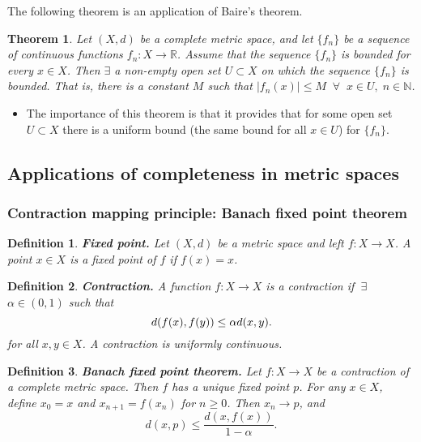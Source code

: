 \documentclass[two column]{article}
\newtheorem{theorem}{Theorem}[subsection]
\newtheorem{definition}{Definition}[subsection]
\begin{document}
The following theorem is an application of Baire's theorem.\\

\begin{theorem}
Let $(X,d)$ be a complete metric space, and let $\{f_{n}\}$ be a sequence of continuous functions $f_{n}: X \rightarrow \mathbb{R}$. Assume that the sequence $\{f_{n}\}$ is bounded for every $x \in X$. Then $\exists$ a non-empty open set $U \subset X$ on which the sequence $\{f_{n}\}$ is bounded. That is, there is a constant $M$ such that $\lvert f_{n}(x) \rvert \leq M \;\; \forall \;\; x\in U, \; n \in \mathbb{N}$.
\end{theorem}
\begin{itemize}
\item The importance of this theorem is that it provides that for some open set $U \subset X$ there is a uniform bound (the same bound for all $x \in U$) for $\{f_{n}\}$.
\end{itemize}

\subsection{Applications of completeness in metric spaces}

\subsubsection{Contraction mapping principle: Banach fixed point theorem}

\begin{definition}
{\bf Fixed point.} Let $(X,d)$ be a metric space and left $f:X \rightarrow X$. A point $x \in X$ is a fixed point of $f$ if $f(x) = x$.\\ 
\end{definition}

\begin{definition}
{\bf Contraction.} A function $f:X \rightarrow X$ is a contraction if $\: \exists$ $\alpha \in (0,1)$ such that \vspace{-6pt}
\[ d(f(x),f(y)) \leq \alpha d(x,y).  \vspace{-6pt} \]
for all $x,y \in X$. A contraction is uniformly continuous.\\
\end{definition}

\begin{definition}
{\bf Banach fixed point theorem.} Let $f:X \rightarrow X$ be a contraction of a complete metric space. Then $f$ has a unique fixed point $p$. For any $x \in X$, define $x_{0} = x$ and $x_{n+1} = f(x_{n})$ for $n \geq 0$. Then $x_{n} \rightarrow p$, and \vspace{-4pt}
\[
d(x,p) \leq \frac{d(x,f(x))}{1 - \alpha}.
\]
\end{definition}
\end{document}
